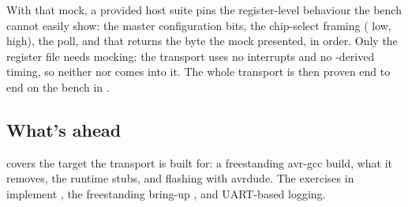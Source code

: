 With that mock, a provided host suite pins the register-level behaviour the bench cannot easily
show: the master configuration bits, the chip-select framing ( low,  high),
the  poll, and that  returns the byte the mock presented, in order. Only
the register file needs mocking; the transport uses no interrupts and no -derived
timing, so neither  nor  comes into it. The whole transport is
then proven end to end on the bench in .

\subsection{What's ahead}
 covers the target the transport is built for: a freestanding avr-gcc
build, what it removes, the  runtime stubs, and flashing with avrdude. The exercises
in  implement , the freestanding bring-up , and
UART-based logging.
